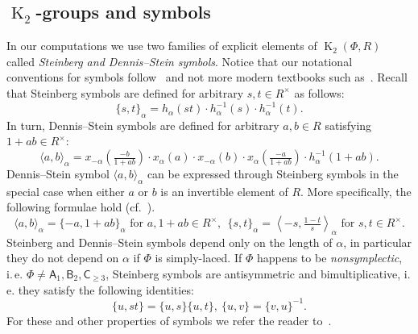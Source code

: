 \documentclass[oneside, 8pt]{amsart}
\theoremstyle{remark}
\theoremstyle{definition}
\numberwithin{lemma}{section}
\numberwithin{prop}{section}
\numberwithin{corollary}{section}
\numberwithin{externaltheorem}{section}
\DeclareMathOperator{\K}{K}
\newcommand{\rA}{\mathsf{A}}
\newcommand{\rB}{\mathsf{B}}
\newcommand{\rC}{\mathsf{C}}
\numberwithin{equation}{section}
\begin{document}
\subsection{\texorpdfstring{$\K_2$}{K2}-groups and symbols} In our computations we use two families of explicit elements of $\K_2(\Phi, R)$ called {\it Steinberg and Dennis--Stein symbols}. Notice that our notational conventions for symbols follow~\cite{DS73} and not more modern textbooks such as~\cite{Kbook}. Recall that Steinberg symbols are defined for arbitrary $s, t \in R^\times$ as follows:
\begin{equation} \label{eq:steinberg} \{ s, t \}_\alpha = h_\alpha(st) \cdot h_\alpha^{-1}(s) \cdot h_\alpha^{-1}(t). \end{equation}
In turn, Dennis--Stein symbols are defined for arbitrary $a, b\in R$ satisfying $1 + ab \in R^\times$:
\begin{equation} \label{eq:dennis-stein}  \langle a,b \rangle _ \alpha = x_{-\alpha}\left(\tfrac{- b}{1 + ab}\right) \cdot x_{\alpha}(a) \cdot x_{-\alpha}(b) \cdot x_{\alpha}\left(\tfrac{- a}{1+ab}\right) \cdot h_{\alpha}^{-1}(1 + ab). \end{equation} 
Dennis--Stein symbol $\langle a, b \rangle_\alpha$ can be expressed through Steinberg symbols in the special case when either $a$ or $b$ is an invertible element of $R$. More specifically, the following formulae hold (cf.~\cite[p.~250]{DS73}).
\begin{equation} \label{DS-S-relationship} \langle a, b \rangle_\alpha = \{-a, 1+ab\}_\alpha\text{ for } a, 1+ab\in R^\times,\ \
 \{ s, t \}_\alpha = \left\langle -s, \tfrac{1 - t}{s} \right\rangle_\alpha\text{ for } s, t\in R^\times. \end{equation}
Steinberg and Dennis--Stein symbols depend only on the length of $\alpha$, in particular they do not depend on $\alpha$ if $\Phi$ is simply-laced. If $\Phi$ happens to be {\it nonsymplectic}, i.\,e. $\Phi \neq \rA_1, \rB_2, \rC_{\geq 3}$, Steinberg symbols are antisymmetric and bimultiplicative, i.\,e. they satisfy the following identities: \begin{equation} \label{eq:symbol-properties} \{ u, st \} = \{ u, s\} \{ u, t \}, \ \{ u, v \} = \{ v, u\}^{-1}. \end{equation}
For these and other properties of symbols we refer the reader to~\cite{DS73}.
\end{document}

